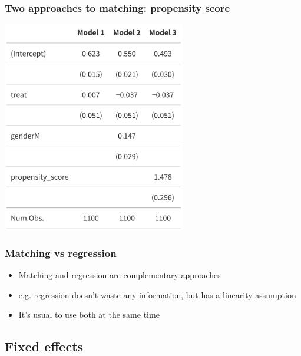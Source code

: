 \documentclass[aspectratio=43]{beamer}
\begin{document}
\begin{frame}
\frametitle{Two approaches to matching: propensity score}
\centering

\includegraphics[width = 0.6\textwidth]{../img/propscore2}

\end{frame}

\begin{frame}
\frametitle{Matching vs regression}
\centering

\begin{itemize}
  \item Matching and regression are complementary approaches
  \item e.g. regression doesn't waste any information, but has a linearity assumption
  \item It's usual to use both at the same time
\end{itemize}

\end{frame}

\subsection*{Fixed effects}
\end{document}
